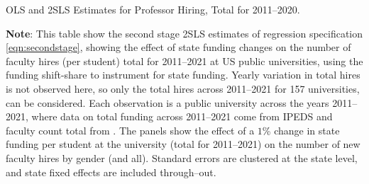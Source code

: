 \begin{table}[h!]
    \singlespacing
    \centering
    \caption{OLS and 2SLS Estimates for Professor Hiring, Total for 2011--2020.}
    \makebox[\textwidth][c]{}
    \label{tab:hiring-shock-reg}
    \justify
    \footnotesize
    \textbf{Note}: 
    This table show the second stage 2SLS estimates of regression specification \eqref{eqn:secondstage}, showing the effect of state funding changes on the number of faculty hires (per student) total for 2011--2021 at US public universities, using the funding shift-share to instrument for state funding.
    Yearly variation in total hires is not observed here, so only the total hires across 2011--2021 for 157 universities, can be considered.
    Each observation is a public university across the years 2011--2021, where data on total funding across 2011--2021 come from IPEDS and faculty count total from \citep{wapman2022quantifying,wapman2022zenodo}.
    The panels show the effect of a $1$\% change in state funding per student at the university (total for 2011--2021) on the number of new faculty hires by gender (and all).
    Standard errors are clustered at the state level, and state fixed effects are included through--out.
\end{table}

